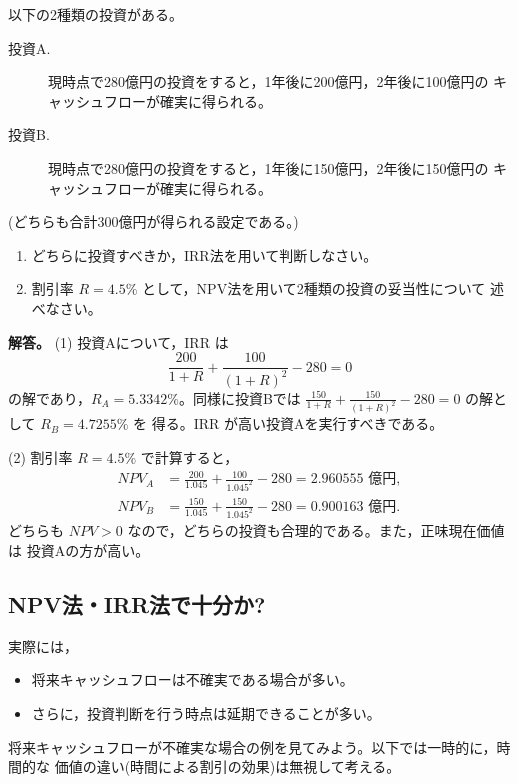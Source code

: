 \begin{example}[例題2-2]
以下の2種類の投資がある。
\begin{description}
\item[投資A.] 現時点で280億円の投資をすると，1年後に200億円，2年後に100億円の
キャッシュフローが確実に得られる。
\item[投資B.] 現時点で280億円の投資をすると，1年後に150億円，2年後に150億円の
キャッシュフローが確実に得られる。
\end{description}
(どちらも合計300億円が得られる設定である。)
\begin{enumerate}
\item[(1)] どちらに投資すべきか，IRR法を用いて判断しなさい。
\item[(2)] 割引率 $R = 4.5\%$ として，NPV法を用いて2種類の投資の妥当性について
述べなさい。
\end{enumerate}

\medskip
\noindent\textbf{解答。}
(1) 投資Aについて，IRR は
\[
\frac{200}{1+R} + \frac{100}{(1+R)^2} - 280 = 0
\]
の解であり，$R_A = 5.3342\%$。同様に投資Bでは
$\frac{150}{1+R} + \frac{150}{(1+R)^2} - 280 = 0$ の解として $R_B = 4.7255\%$ を
得る。IRR が高い投資Aを実行すべきである。

(2) 割引率 $R=4.5\%$ で計算すると，
\begin{align*}
NPV_A &= \frac{200}{1.045} + \frac{100}{1.045^2} - 280 = 2.960555\text{ 億円},\\
NPV_B &= \frac{150}{1.045} + \frac{150}{1.045^2} - 280 = 0.900163\text{ 億円}.
\end{align*}
どちらも $NPV>0$ なので，どちらの投資も合理的である。また，正味現在価値は
投資Aの方が高い。
\end{example}

\vspace{18pt}

\subsection{NPV法・IRR法で十分か?}

実際には，
\begin{itemize}
\item 将来キャッシュフローは不確実である場合が多い。
\item さらに，投資判断を行う時点は延期できることが多い。
\end{itemize}

将来キャッシュフローが不確実な場合の例を見てみよう。以下では一時的に，時間的な
価値の違い(時間による割引の効果)は無視して考える。

